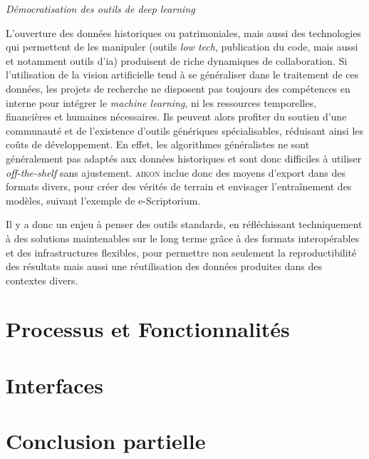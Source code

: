 \documentclass[a4paper,12pt,twoside]{book}
\newcommand{\aikon}{\textsc{aikon}\xspace}
\newcommand{\dl}{\emph{deep learning}\xspace}
\newcommand{\ia}{\gls{ia}\xspace}
\newcommand{\ml}{\emph{machine learning}\xspace}
\newcommand{\clearemptydoublepage}{\newpage{\pagestyle{empty}\cleardoublepage}}
\begin{document}
\emph{Démocratisation des outils de \dl}

L'ouverture des données historiques ou patrimoniales, mais aussi des
technologies qui permettent de les manipuler (outils \textit{low tech},
publication du code, mais aussi et notamment outils d'\ia) produisent de
riche dynamiques de collaboration. Si l'utilisation de la vision
artificielle tend à se généraliser dans le traitement de ces données,
les projets de recherche ne disposent pas toujours des compétences en
interne pour intégrer le \ml, ni les ressources
temporelles, financières et humaines nécessaires. Ils peuvent alors profiter du
soutien d'une communauté et de l'existence d'outils génériques
spécialisables, réduisant ainsi les coûts de développement. En effet, les
algorithmes généralistes ne sont généralement pas adaptés aux données
historiques et sont donc difficiles à utiliser \textit{off-the-shelf} sans
ajustement. \aikon inclue donc des moyens d'export dans des formats
divers, pour créer des vérités de terrain et envisager l'entraînement des modèles, suivant l'exemple de e-Scriptorium.

Il y a donc un enjeu à penser des outils standards, en réfléchissant
techniquement à des solutions maintenables sur le long terme grâce à
des formats interopérables et des infrastructures flexibles, pour
permettre non seulement la reproductibilité des résultats mais aussi une
réutilisation des données produites dans des contextes divers.        
            
        \clearemptydoublepage
        
        \hypertarget{chapitre-7-processus-et-fonctionnalites}{%
\chapter{Processus et
Fonctionnalités}\label{chapitre-7-processus-et-fonctionnalites}}

  
            
        \clearemptydoublepage
        
\hypertarget{chapitre-8-interfaces}{%
\chapter{Interfaces}\label{chapitre-8-interfaces}}




        \clearemptydoublepage

        \chapter*{Conclusion partielle}
\end{document}
